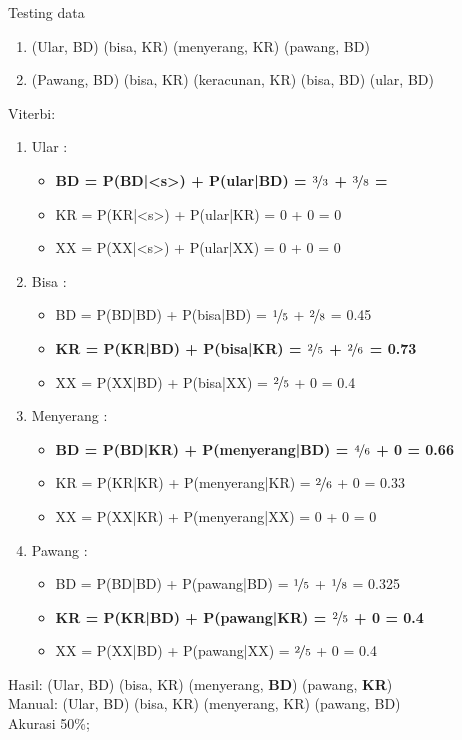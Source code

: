 \documentclass[paper=a4, fontsize=11pt]{scrartcl} %
\numberwithin{equation}{section} %
\numberwithin{figure}{section} %
\numberwithin{table}{section} %
\begin{document}
Testing data
\begin{enumerate}	
	\item (Ular, BD) (bisa, KR) (menyerang, KR) (pawang, BD)
	\item (Pawang, BD) (bisa, KR) (keracunan, KR) (bisa, BD) (ular, BD)
\end{enumerate}

Viterbi:
\begin{enumerate}
	\item Ular :
	\begin{itemize}
		\item \textbf{BD = P(BD|<s>) + P(ular|BD) = $\nicefrac{3}{3}$ + $\nicefrac{3}{8}$ = }				
		\item KR = P(KR|<s>) + P(ular|KR) = 0 + 0 = 0
		\item XX = P(XX|<s>) + P(ular|XX) = 0 + 0 = 0				
	\end{itemize}
	\item Bisa :
	\begin{itemize}
		\item BD = P(BD|BD) + P(bisa|BD) = $\nicefrac{1}{5}$ + $\nicefrac{2}{8}$ = 0.45
		\item \textbf{KR = P(KR|BD) + P(bisa|KR) = $\nicefrac{2}{5}$ + $\nicefrac{2}{6}$ = 0.73}
		\item XX = P(XX|BD) + P(bisa|XX) = $\nicefrac{2}{5}$ + 0 = 0.4				
	\end{itemize}
	\item Menyerang :
	\begin{itemize}
		\item \textbf{BD = P(BD|KR) + P(menyerang|BD) = $\nicefrac{4}{6}$ + 0 = 0.66}
		\item KR = P(KR|KR) + P(menyerang|KR) = $\nicefrac{2}{6}$ + 0 = 0.33
		\item XX = P(XX|KR) + P(menyerang|XX) = 0 + 0 = 0				
	\end{itemize}
	\item Pawang : 
	\begin{itemize}
		\item BD = P(BD|BD) + P(pawang|BD) = $\nicefrac{1}{5}$ + $\nicefrac{1}{8}$ = 0.325
		\item \textbf{KR = P(KR|BD) + P(pawang|KR) = $\nicefrac{2}{5}$ + 0 = 0.4}
		\item XX = P(XX|BD) + P(pawang|XX) = $\nicefrac{2}{5}$ + 0 = 0.4
	\end{itemize}		
\end{enumerate}

Hasil: (Ular, BD) (bisa, KR) (menyerang, \textbf{BD}) (pawang, \textbf{KR}) \\
Manual: (Ular, BD) (bisa, KR) (menyerang, KR) (pawang, BD) \\
Akurasi 50\%;
\end{document}
